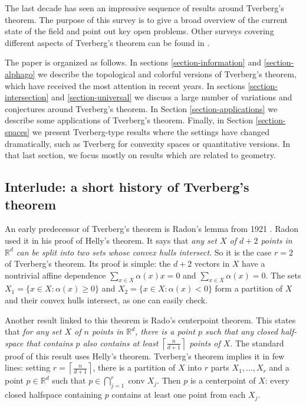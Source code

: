 \documentclass[11pt]{article}
\newcommand{\rr}{\mathbb{R}}
\newcommand{\al}{\alpha}
\DeclareMathOperator{\conv}{conv}
\begin{document}
	The last decade has seen an impressive sequence of results around Tverberg's theorem.  The purpose of this survey is to give a broad overview of  the current state of the field and point out key open problems.  Other surveys covering different aspects of Tverberg's theorem can be found in \cite{Eckhoff:1979bi, Eck93survey, Matousek:2002td, BBZ17survey, de2017discrete, BZ17}.
	
	The paper is organized as follows.  In sections \ref{section-information} and \ref{section-alphago} we describe the topological and colorful versions of Tverberg's theorem, which have received the most attention in recent years.  In sections \ref{section-intersection} and \ref{section-universal} we discuss a large number of variations and conjectures around Tverberg's theorem.  In Section \ref{section-applications} we describe some applications of Tverberg's theorem.  Finally, in Section \ref{section-spaces} we present Tverberg-type results where the settings have changed dramatically, such as Tverberg for convexity spaces or quantitative versions.  In that last section, we focus mostly on results which are related to geometry.
	
	\subsection{Interlude: a short history of Tverberg's theorem}
	An early predecessor of Tverberg's theorem is Radon's lemma from 1921 \cite{Radon:1921vh, Eckhoff:1979bi}. Radon used it in his proof of Helly's theorem. It says that \textit{any set $X$ of $d+2$ points in $\rr^d$ can be split into two sets whose convex hulls intersect}. So it is the case $r=2$ of Tverberg's theorem. Its proof is simple: the $d+2$ vectors in $X$ have a nontrivial affine dependence $\sum_{x \in X}\al(x)x=0$ and  $\sum_{x \in X}\al(x)=0$. The sets $X_1=\{x \in X: \al(x)\ge 0\}$ and $X_2=\{x \in X: \al(x) < 0\}$ form a partition of $X$ and their convex hulls intersect, as one can easily check.
	
	Another result linked to this theorem is Rado's centerpoint theorem.  This states that \textit{for any set $X$ of $n$ points in $\rr^d$, there is a point $p$ such that any closed half-space that contains $p$ also contains at least $\left\lceil \frac{n}{d+1}\right\rceil$ points of $X$}. The standard proof of this result uses Helly's theorem. Tverberg's theorem implies it in few lines: setting $r=\left\lceil \frac{n}{d+1}\right\rceil$, there is a partition of $X$ into $r$ parts $X_1,\ldots,X_r$ and a point $p\in \rr^d$ such that $p \in \bigcap_{j=1}^r \conv X_j$. Then $p$ is a centerpoint of $X$: every closed halfspace containing $p$ contains at least one point from each $X_j$.
	
\end{document}
